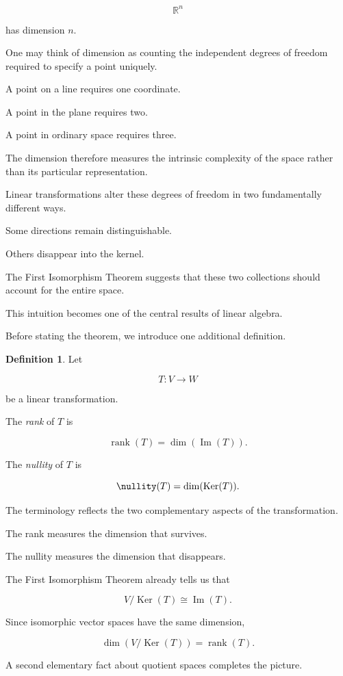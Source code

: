\documentclass[11pt]{book}
\numberwithin{equation}{chapter}
\theoremstyle{definition}
\newtheorem{definition}{Definition}[chapter]
\theoremstyle{plain}
\theoremstyle{remark}
\DeclareMathOperator{\Ker}{Ker}
\DeclareMathOperator{\Image}{Im}
\DeclareMathOperator{\rank}{rank}
\begin{document}
\[
\mathbb{R}^n
\]

has dimension \(n\).

One may think of dimension as counting the independent degrees of freedom required to specify a point uniquely.

A point on a line requires one coordinate.

A point in the plane requires two.

A point in ordinary space requires three.

The dimension therefore measures the intrinsic complexity of the space rather than its particular representation.

Linear transformations alter these degrees of freedom in two fundamentally different ways.

Some directions remain distinguishable.

Others disappear into the kernel.

The First Isomorphism Theorem suggests that these two collections should account for the entire space.

This intuition becomes one of the central results of linear algebra.

Before stating the theorem, we introduce one additional definition.

\begin{definition}
Let

\[
T:V\rightarrow W
\]

be a linear transformation.

The \emph{rank} of \(T\) is

\[
\rank(T)
=
\dim(\Image(T)).
\]

The \emph{nullity} of \(T\) is

\[
\nullity(T)
=
\dim(\Ker(T)).
\]
\end{definition}

The terminology reflects the two complementary aspects of the transformation.

The rank measures the dimension that survives.

The nullity measures the dimension that disappears.

The First Isomorphism Theorem already tells us that

\[
V/\Ker(T)
\cong
\Image(T).
\]

Since isomorphic vector spaces have the same dimension,

\[
\dim(V/\Ker(T))
=
\rank(T).
\]

A second elementary fact about quotient spaces completes the picture.
\end{document}
